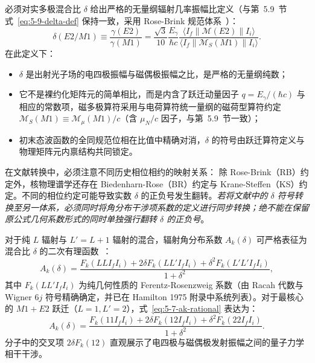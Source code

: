 必须对实多极混合比 $\delta$ 给出严格的无量纲辐射几率振幅比定义（与第~5.9~节式~\eqref{eq:5-9-delta-def} 保持一致，采用 Rose-Brink 规范体系~\cite{lange-kumar-hamilton-1982-multipole-admixtures, book-hamilton-electromagnetic-interaction}）：
\begin{equation}\label{eq:5-7-delta-def}
\delta(E2/M1) \equiv \frac{\gamma(E2)}{\gamma(M1)} = \frac{\sqrt{3}}{10} \frac{E_\gamma}{\hbar c} \frac{\langle I_f \| \mathcal{M}(E2) \| I_i \rangle}{\langle I_f \| \mathcal{M}_S(M1) \| I_i \rangle}.
\end{equation}
在此定义下：
\begin{itemize}
\item $\delta$ 是出射光子场的电四极振幅与磁偶极振幅之比，是严格的无量纲纯数；
\item 它不是裸约化矩阵元的简单相比，而是内含了跃迁动量因子 $q = E_\gamma / (\hbar c)$ 与相应的常数项，磁多极算符采用与电荷算符统一量纲的磁荷型算符约定 $\mathcal{M}_S(M1) \equiv \mathcal{M}_\mu(M1) / c$（含 $\mu_N/c$ 因子，与第~5.9~节一致）；
\item 初末态波函数的全同规范位相在比值中精确对消，$\delta$ 的符号由跃迁算符定义与物理矩阵元内禀结构共同锁定。
\end{itemize}

在文献转换中，必须注意不同历史相位相约的映射关系：
除 Rose-Brink（RB）约定外，核物理谱学还存在 Biedenharn-Rose（BR）约定与 Krane-Steffen（KS）约定。不同的相位约定可能导致实数 $\delta$ 的正负号发生翻转。\emph{若将文献中的 $\delta$ 符号转换至另一体系，必须同时将角分布干涉项系数的定义进行同步转换；绝不能在保留原公式几何系数形式的同时单独强行翻转 $\delta$ 的正负号}。

对于纯 $L$ 辐射与 $L'=L+1$ 辐射的混合，辐射角分布系数 $A_k(\delta)$ 可严格表征为混合比 $\delta$ 的二次有理函数~\cite{lange-kumar-hamilton-1982-multipole-admixtures}：
\begin{equation}\label{eq:5-7-ak-rational}
A_k(\delta) = \frac{F_k(L L I_f I_i) + 2\delta F_k(L L' I_f I_i) + \delta^2 F_k(L' L' I_f I_i)}{1 + \delta^2},
\end{equation}
其中 $F_k(L L' I_f I_i)$ 为纯几何性质的 Ferentz-Rosenzweig 系数（由 Racah 代数与 Wigner $6j$ 符号精确确定，并已在 Hamilton 1975 附录中系统列表）。对于最核心的 $M1+E2$ 跃迁（$L=1, L'=2$），式~\eqref{eq:5-7-ak-rational} 表达为：
\begin{equation}\label{eq:5-7-ak-m1e2}
A_k(\delta) = \frac{F_k(1 1 I_f I_i) + 2\delta F_k(1 2 I_f I_i) + \delta^2 F_k(2 2 I_f I_i)}{1 + \delta^2}.
\end{equation}
分子中的交叉项 $2\delta F_k(1 2)$ 直观展示了电四极与磁偶极发射振幅之间的量子力学相干干涉。

